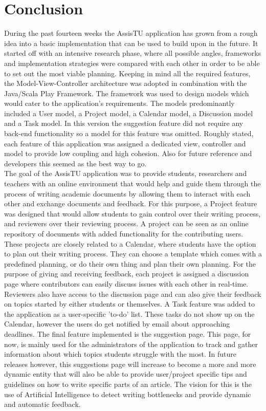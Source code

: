 \chapter{Conclusion}

During the past fourteen weeks the AssisTU application has grown from a rough idea into a basic implementation that can be used to build upon in the 
future. It started off with an intensive research phase, where all possible angles, frameworks and implementation strategies were compared with each
other in order to be able to set out the most viable planning. Keeping in mind all the required features, the Model-View-Controller architecture was 
adopted in combination with the Java/Scala Play Framework.
The framework was used to design models which would cater to the application's requirements. The models predominantly included a User model, a Project 
model, a Calendar model, a Discussion model and a Task model. In this version the suggestion feature did not require any back-end functionality so a 
model for this feature was omitted. Roughly stated, each feature of this application was assigned a dedicated view, controller and model to provide low
coupling and high cohesion. Also for future reference and developers this seemed as the best way to go. \\

The goal of the AssisTU application was to provide students, researchers and teachers with an online environment that would help and guide them through
the process of writing academic documents by allowing them to interact with each other and exchange documents and feedback. For this purpose, a Project
feature was designed that would allow students to gain control over their writing process, and reviewers over their reviewing process. A project can be
seen as an online repository of documents with added functionality for the contributing users. These projects are closely related to a Calendar,
where students have the option to plan out their writing process. They can choose a template which comes with a predefined planning, or do their
own thing and plan their own planning. For the purpose of giving and receiving feedback, each project is assigned a discussion page where contributors
can easily discuss issues with each other in real-time. Reviewers also have access to the discussion page and can also give their feedback on topics
started by either students or themselves. A Task feature was added to the application as a user-specific 'to-do' list. These tasks do not show up
on the Calendar, however the users do get notified by email about approaching deadlines. The final feature implemented is the suggestion page. This page,
for now, is mainly used for the administrators of the application to track and gather information about which topics students struggle with the most. In 
future releases however, this suggestions page will increase to become a more and more dynamic entity that will also be able to provide user/project 
specific tips and guidelines on how to write specific parts of an article. The vision for this is the use of Artificial Intelligence to detect writing 
bottlenecks and provide dynamic and automatic feedback.